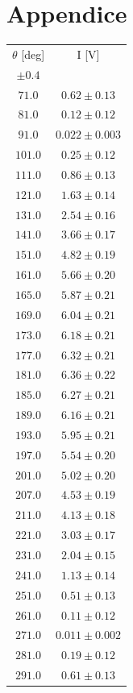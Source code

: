 \documentclass[10pt,oneside,a4paper]{article}
\begin{document}
\section{Appendice}

\begin{table}[H]
\centering
{}
\label{tab:malus1}
\begin{tabular}{cc}
\hline
 $\theta$ [deg]& I [V]\\
 $\pm 0.4$ & \\
\hline
 $ 71.0 $& $  0.62  \pm 0.13 $\\
 $  81.0$  &$ 0.12\pm 0.12 $\\
 $ 91.0 $& $ 0.022 \pm 0.003  $\\
 $101.0$ &$  0.25 \pm 0.12 $\\
  $111.0 $ & $ 0.86 \pm 0.13 $\\
 $121.0$ &$  1.63 \pm 0.14 $\\
 $131.0$ &$  2.54 \pm 0.16 $ \\
 $141.0$ &$  3.66 \pm 0.17 $\\
 $151.0$ &$  4.82 \pm 0.19 $\\
 $161.0$ &$  5.66 \pm 0.20  $\\
 $165.0$ &$  5.87 \pm 0.21 $\\
 $169.0$ &$  6.04 \pm 0.21 $\\
 $173.0$ &$  6.18 \pm 0.21 $\\
 $177.0$ &$  6.32 \pm 0.21 $\\
 $181.0$ &$  6.36 \pm 0.22 $\\
 $185.0$ &$  6.27 \pm 0.21 $\\
 $189.0$ &$  6.16 \pm 0.21 $\\
 $193.0$ &$  5.95 \pm 0.21 $\\
 $197.0$ &$  5.54 \pm 0.20 $\\
 $201.0$ &$  5.02 \pm 0.20 $\\
 $207.0$ &$  4.53 \pm 0.19 $\\
 $ 211.0$ &$ 4.13 \pm 0.18$ \\
 $221.0$ &$  3.03 \pm 0.17 $\\
 $231.0$ &$  2.04 \pm 0.15 $\\
 $241.0$ &$  1.13 \pm 0.14 $\\
 $251.0$ &$  0.51 \pm 0.13 $\\
 $261.0$ &$  0.11 \pm 0.12 $ \\
 $271.0$ &$  0.011 \pm 0.002 $\\
 $281.0$ &$  0.19 \pm 0.12 $\\
 $291.0$ &$  0.61 \pm 0.13 $\\
\hline
\end{tabular}
\end{table}
\end{document}
